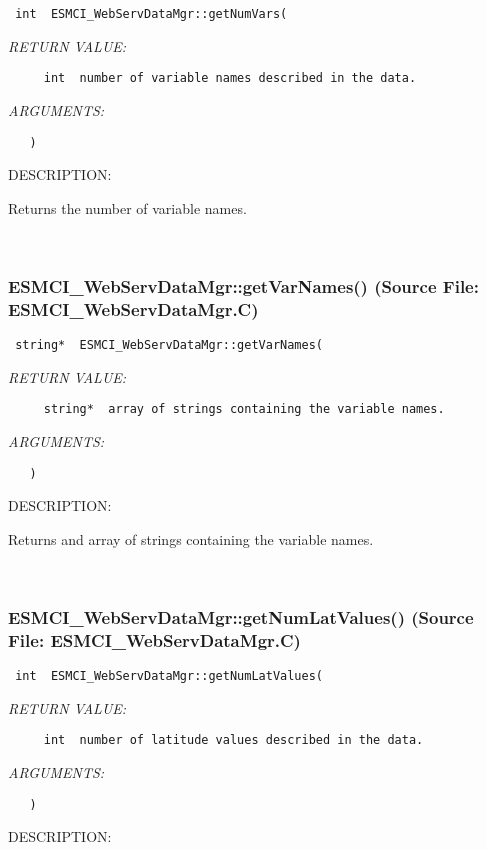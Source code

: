   
\begin{verbatim} int  ESMCI_WebServDataMgr::getNumVars(\end{verbatim}{\em RETURN VALUE:}
\begin{verbatim}     int  number of variable names described in the data.\end{verbatim}{\em ARGUMENTS:}
\begin{verbatim}   )\end{verbatim}
{\sf DESCRIPTION:\\ }


      Returns the number of variable names.
   
 
\mbox{}\hrulefill\
 
\subsubsection{ESMCI\_WebServDataMgr::getVarNames() (Source File: ESMCI\_WebServDataMgr.C)}


  
\begin{verbatim} string*  ESMCI_WebServDataMgr::getVarNames(\end{verbatim}{\em RETURN VALUE:}
\begin{verbatim}     string*  array of strings containing the variable names.\end{verbatim}{\em ARGUMENTS:}
\begin{verbatim}   )\end{verbatim}
{\sf DESCRIPTION:\\ }


      Returns and array of strings containing the variable names.
   
 
\mbox{}\hrulefill\
 
\subsubsection{ESMCI\_WebServDataMgr::getNumLatValues() (Source File: ESMCI\_WebServDataMgr.C)}


  
\begin{verbatim} int  ESMCI_WebServDataMgr::getNumLatValues(\end{verbatim}{\em RETURN VALUE:}
\begin{verbatim}     int  number of latitude values described in the data.\end{verbatim}{\em ARGUMENTS:}
\begin{verbatim}   )\end{verbatim}
{\sf DESCRIPTION:\\ }


